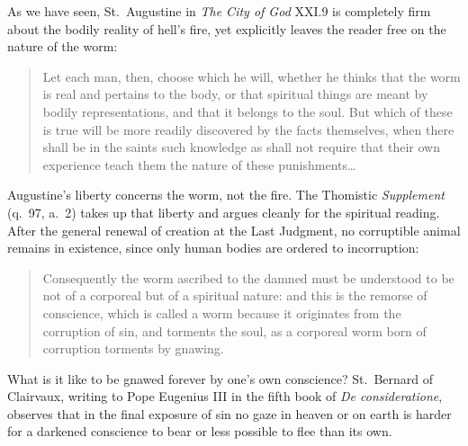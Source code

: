 As we have seen, St.\ Augustine in \textit{The City of God} XXI.9 is completely firm about the bodily reality of hell's fire, yet explicitly leaves the reader free on the nature of the worm:

\begin{quote}
Let each man, then, choose which he will, whether he thinks that the worm is real and pertains to the body, or that spiritual things are meant by bodily representations, and that it belongs to the soul. But which of these is true will be more readily discovered by the facts themselves, when there shall be in the saints such knowledge as shall not require that their own experience teach them the nature of these punishments\dots{}
\end{quote}

Augustine's liberty concerns the worm, not the fire. The Thomistic \textit{Supplement} (q.\ 97, a.\ 2) takes up that liberty and argues cleanly for the spiritual reading. After the general renewal of creation at the Last Judgment, no corruptible animal remains in existence, since only human bodies are ordered to incorruption:

\begin{quote}
Consequently the worm ascribed to the damned must be understood to be not of a corporeal but of a spiritual nature: and this is the remorse of conscience, which is called a worm because it originates from the corruption of sin, and torments the soul, as a corporeal worm born of corruption torments by gnawing.
\end{quote}

What is it like to be gnawed forever by one's own conscience? St.\ Bernard of Clairvaux, writing to Pope Eugenius III in the fifth book of \textit{De consideratione}, observes that in the final exposure of sin no gaze in heaven or on earth is harder for a darkened conscience to bear or less possible to flee than its own.

